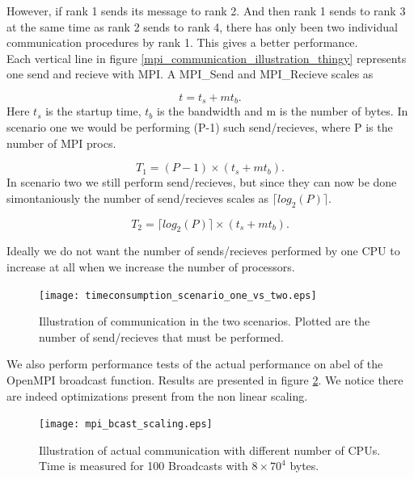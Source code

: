 \documentclass[a4paper,norsk,11pt,twoside]{report}
\begin{document}
However, if rank 1 sends its message to rank 2. And then rank 1 sends to rank 3 at the same time as rank 2 sends to rank 4, there has only been two individual communication procedures by rank 1. This gives a better performance. \\

Each vertical line in figure \ref{mpi_communication_illustration_thingy} represents one send and recieve with MPI. A MPI\_Send and MPI\_Recieve scales as

\begin{equation}
t = t_s + m t_b .
\end{equation}
Here $t_s$ is the startup time, $t_b$ is the bandwidth and m is the number of bytes. In scenario one we would be performing (P-1) such send/recieves, where P is the number of MPI procs.

\begin{equation}
T_1 = (P-1) \times (t_s + m t_b) .
\end{equation}
In scenario two we still perform send/recieves, but since they can now be done simontaniously the number of send/recieves scales as $\lceil log_2(P) \rceil$.

\begin{equation}
T_2 = \lceil log_2(P) \rceil \times (t_s + m t_b) .
\end{equation}

Ideally we do not want the number of sends/recieves performed by one CPU to increase at all when we increase the number of processors. \\

\newpage

\begin{figure}[ht!]
\centering
\texttt{[image: timeconsumption\_scenario\_one\_vs\_two.eps]}
\caption{Illustration of communication in the two scenarios. Plotted are the number of send/recieves that must be performed.}
\label{mpi_communication_illustration_thingy2}
\end{figure}

We also perform performance tests of the actual performance on abel of the OpenMPI broadcast function. Results are presented in figure \ref{mpi_communication_real}. We notice there are indeed optimizations present from the non linear scaling. 

\begin{figure}[ht!]
\centering
\texttt{[image: mpi\_bcast\_scaling.eps]}
\caption{Illustration of actual communication with different number of CPUs. Time is measured for 100 Broadcasts with $8 \times 70^4$ bytes.}
\label{mpi_communication_real}
\end{figure}
\end{document}
